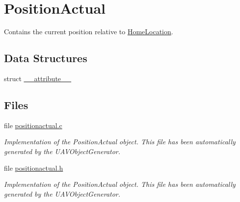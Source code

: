 \hypertarget{group___position_actual}{\section{\-Position\-Actual}
\label{group___position_actual}
}


\-Contains the current position relative to \hyperlink{group___home_location}{\-Home\-Location}.  


\subsection*{\-Data \-Structures}
\begin{DoxyCompactItemize}
\item 
struct \hyperlink{struct____attribute____}{\-\_\-\-\_\-attribute\-\_\-\-\_\-}
\end{DoxyCompactItemize}
\subsection*{\-Files}
\begin{DoxyCompactItemize}
\item 
file \hyperlink{positionactual_8c}{positionactual.\-c}
\begin{DoxyCompactList}\small\item\em \-Implementation of the \-Position\-Actual object. \-This file has been automatically generated by the \-U\-A\-V\-Object\-Generator. \end{DoxyCompactList}\item 
file \hyperlink{positionactual_8h}{positionactual.\-h}
\begin{DoxyCompactList}\small\item\em \-Implementation of the \-Position\-Actual object. \-This file has been automatically generated by the \-U\-A\-V\-Object\-Generator. \end{DoxyCompactList}\end{DoxyCompactItemize}
